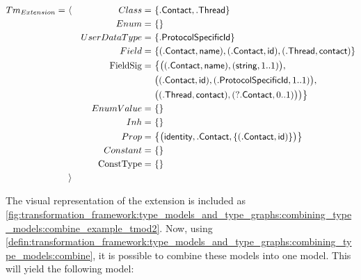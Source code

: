 \begin{align*}
Tm_{Extension} =\ &\langle&
Class =\ &\{ \mathsf{.Contact}, \mathsf{.Thread} \} \\&&
Enum =\ &\{\} \\&&
UserDataType =\ &\{ \mathsf{.ProtocolSpecificId} \} \\&&
Field =\ &\{
( \mathsf{.Contact}, \mathsf{name} ), 
( \mathsf{.Contact}, \mathsf{id} ), 
( \mathsf{.Thread}, \mathsf{contact} )\} \\&&
\mathrm{FieldSig} =\ &\big\{
\big( ( \mathsf{.Contact}, \mathsf{name} ), ( \mathsf{string}, 1..1 ) \big),\\&&& \big( ( \mathsf{.Contact}, \mathsf{id} ), ( \mathsf{.ProtocolSpecificId}, 1..1 ) \big),\\&&& 
\big( ( \mathsf{.Thread}, \mathsf{contact} ), ( ?\mathsf{.Contact}, 0..1 ) \big) \big)
\big\} \\&&
EnumValue =\ &\{\} \\&&
Inh =\ &\{\} \\&&
Prop =\ &\big\{
\big( \mathsf{identity}, \mathsf{.Contact}, \{( \mathsf{.Contact}, \mathsf{id} )\} \big)
\big\} \\&&
Constant =\ &\{\} \\&&
\mathrm{ConstType} =\ &\{\}
\\&\rangle
\end{align*}

The visual representation of the extension is included as \cref{fig:transformation_framework:type_models_and_type_graphs:combining_type_models:combine_example_tmod2}. Now, using \cref{defin:transformation_framework:type_models_and_type_graphs:combining_type_models:combine}, it is possible to combine these models into one model. This will yield the following model:

